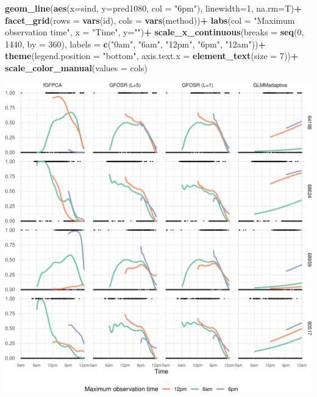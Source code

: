 \documentclass[
]{article}
\newenvironment{Shaded}{\begin{snugshade}}{\end{snugshade}}
\newcommand{\AttributeTok}[1]{\textcolor[rgb]{0.13,0.29,0.53}{#1}}
\newcommand{\DecValTok}[1]{\textcolor[rgb]{0.00,0.00,0.81}{#1}}
\newcommand{\FunctionTok}[1]{\textcolor[rgb]{0.13,0.29,0.53}{\textbf{#1}}}
\newcommand{\NormalTok}[1]{#1}
\newcommand{\SpecialCharTok}[1]{\textcolor[rgb]{0.81,0.36,0.00}{\textbf{#1}}}
\newcommand{\StringTok}[1]{\textcolor[rgb]{0.31,0.60,0.02}{#1}}
\begin{document}
\begin{Shaded}
\begin{Highlighting}[]
  \FunctionTok{geom\_line}\NormalTok{(}\FunctionTok{aes}\NormalTok{(}\AttributeTok{x=}\NormalTok{sind, }\AttributeTok{y=}\NormalTok{pred1080, }\AttributeTok{col =} \StringTok{"6pm"}\NormalTok{), }\AttributeTok{linewidth=}\DecValTok{1}\NormalTok{, }\AttributeTok{na.rm=}\NormalTok{T)}\SpecialCharTok{+}
  \FunctionTok{facet\_grid}\NormalTok{(}\AttributeTok{rows =} \FunctionTok{vars}\NormalTok{(id), }\AttributeTok{cols =} \FunctionTok{vars}\NormalTok{(method))}\SpecialCharTok{+}
  \FunctionTok{labs}\NormalTok{(}\AttributeTok{col =} \StringTok{"Maximum observation time"}\NormalTok{, }\AttributeTok{x =} \StringTok{"Time"}\NormalTok{, }\AttributeTok{y=}\StringTok{""}\NormalTok{)}\SpecialCharTok{+}
  \FunctionTok{scale\_x\_continuous}\NormalTok{(}\AttributeTok{breaks =} \FunctionTok{seq}\NormalTok{(}\DecValTok{0}\NormalTok{, }\DecValTok{1440}\NormalTok{, }\AttributeTok{by =} \DecValTok{360}\NormalTok{),}
                     \AttributeTok{labels =} \FunctionTok{c}\NormalTok{(}\StringTok{"0am"}\NormalTok{, }\StringTok{"6am"}\NormalTok{, }\StringTok{"12pm"}\NormalTok{, }\StringTok{"6pm"}\NormalTok{, }\StringTok{"12am"}\NormalTok{))}\SpecialCharTok{+}
  \FunctionTok{theme}\NormalTok{(}\AttributeTok{legend.position =} \StringTok{"bottom"}\NormalTok{, }\AttributeTok{axis.text.x =} \FunctionTok{element\_text}\NormalTok{(}\AttributeTok{size =} \DecValTok{7}\NormalTok{))}\SpecialCharTok{+}
  \FunctionTok{scale\_color\_manual}\NormalTok{(}\AttributeTok{values =}\NormalTok{ cols)}
\end{Highlighting}
\end{Shaded}

\includegraphics{manuscript_files/figure-latex/fig_appl_paper-1.pdf}
\end{document}
